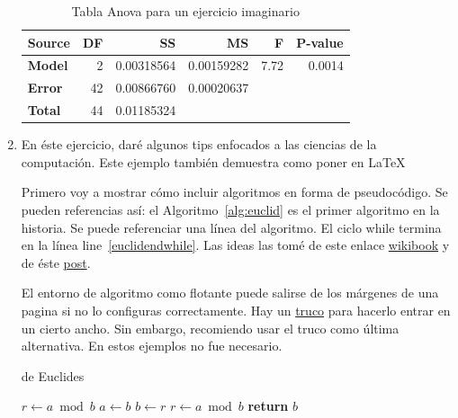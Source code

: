 \begin{enumerate}
\begin{table}[htb]
  \begin{center}
    \begin{tabular}{l | r r r r r}
      \toprule
      Source & \textbf{DF} & \textbf{SS} & \textbf{MS} & \textbf{F} & \textbf{P-value} \\
      \midrule
      \textbf{Model} & 2 & 0.00318564 & 0.00159282 & 7.72 & 0.0014 \\
      \textbf{Error} & 42 & 0.00866760 & 0.00020637 &  & \\
      \midrule
      \textbf{Total} & 44 & 0.01185324 &   &  & \\
      \bottomrule
    \end{tabular}
  \end{center}
\caption{Tabla Anova para un ejercicio imaginario}
\label{tab:exey}
\end{table}

\item En éste ejercicio, daré algunos tips enfocados a las ciencias de la computación.
Este ejemplo también demuestra como poner  en \LaTeX{}

Primero voy a mostrar cómo incluir algoritmos en forma de pseudocódigo.
Se pueden referencias así: el Algoritmo~\ref{alg:euclid} es el primer algoritmo en la historia.
Se puede referenciar una línea del algoritmo.
El ciclo while termina en la línea line~\ref{euclidendwhile}.
Las ideas las tomé de este enlace \href{https://en.wikibooks.org/wiki/LaTeX/Algorithms#Typesetting_using_the_algorithmicx_package}{wikibook} y de éste \href{https://tex.stackexchange.com/questions/229355/algorithm-algorithmic-algorithmicx-algorithm2e-algpseudocode-confused}{post}.

El entorno de algoritmo como flotante puede salirse de los márgenes de una pagina si no lo configuras correctamente.
Hay un \href{https://tex.stackexchange.com/questions/350434/adjust-width-of-algorithm-float}{truco} para hacerlo entrar en un cierto ancho.
Sin embargo, recomiendo usar el truco como última alternativa.
En estos ejemplos no fue necesario.

\begin{algorithm}[H]
\caption{de Euclides}
\label{alg:euclid}
\begin{algorithmic}[1] %
     
    \State $r\gets a \bmod b$
     
        \State $a \gets b$
        \State $b \gets r$
        \State $r \gets a \bmod b$
    \EndWhile\label{euclidendwhile}
    \State \textbf{return} $b$
    \EndProcedure
\end{algorithmic}
\end{algorithm}


\end{enumerate}
